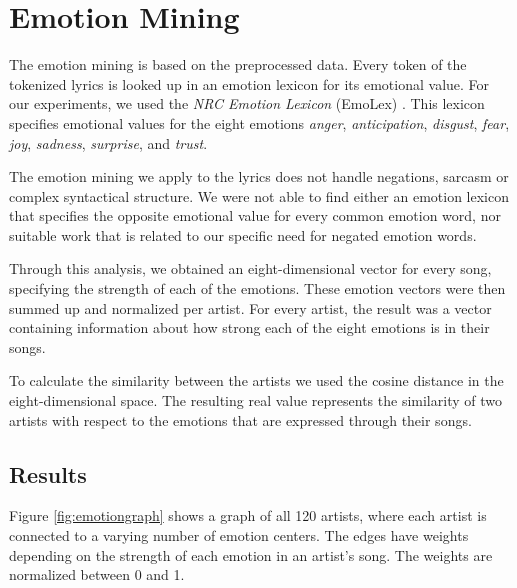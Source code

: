 \documentclass[10pt,a4paper]{article}
\begin{document}
	
	\section{Emotion Mining}
	\label{sec:emotionmining}
	
	The emotion mining is based on the preprocessed data. Every token of the tokenized lyrics is looked up in an emotion lexicon for its emotional value. For our experiments, we used the \textit{NRC Emotion Lexicon} (EmoLex) \cite{emolex}. This lexicon specifies emotional values for the eight emotions \textit{anger}, \textit{anticipation}, \textit{disgust}, \textit{fear}, \textit{joy}, \textit{sadness}, \textit{surprise}, and \textit{trust}.
	
	The emotion mining we apply to the lyrics does not handle negations, sarcasm or complex syntactical structure. We were not able to find either an emotion lexicon that specifies the opposite emotional value for every common emotion word, nor suitable work that is related to our specific need for negated emotion words.
	
	Through this analysis, we obtained an eight-dimensional vector for every song, specifying the strength of each of the emotions. These emotion vectors were then summed up and normalized per artist. For every artist, the result was a vector containing information about how strong each of the eight emotions is in their songs.
	
	To calculate the similarity between the artists we used the cosine distance in the eight-dimensional space. The resulting real value represents the similarity of two artists with respect to the emotions that are expressed through their songs.
	
		\subsection{Results}
		Figure \ref{fig:emotiongraph} shows a graph of all 120 artists, where each artist is connected to a varying number of emotion centers. The edges have weights depending on the strength of each emotion in an artist's song. The weights are normalized between 0 and 1.
		
\end{document}
